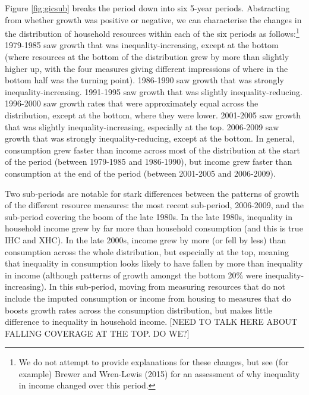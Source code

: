 Figure \ref{fig:gicsub} breaks the period down into six 5-year periods. Abstracting from whether growth was positive or negative, we can characterise the changes in the distribution of household resources within each of the six periods as follows:\footnote{We do not attempt to provide explanations for these changes, but see (for example) Brewer and Wren-Lewis (2015) for an assessment of why inequality in income changed over this period.} 1979-1985 saw growth that was inequality-increasing, except at the bottom (where resources at the bottom of the distribution grew by more than slightly higher up, with the four measures giving different impressions of where in the bottom half was the turning point). 1986-1990 saw growth that was strongly inequality-increasing. 1991-1995 saw growth that was slightly inequality-reducing. 1996-2000 saw growth rates that were approximately equal across the distribution, except at the bottom, where they were lower. 2001-2005 saw growth that was slightly inequality-increasing, especially at the top. 2006-2009 saw growth that was strongly inequality-reducing, except at the bottom. In general, consumption grew faster than income across most of the distribution at the start of the period (between 1979-1985 and 1986-1990), but income grew faster than consumption at the end of the period (between 2001-2005 and 2006-2009).

Two sub-periods are notable for stark differences between the patterns of growth of the different resource measures: the most recent sub-period, 2006-2009, and the sub-period covering the boom of the late 1980s.  In the late 1980s, inequality in household income grew by far more than household consumption (and this is true IHC and XHC). In the late 2000s, income grew by more (or fell by less) than consumption across the whole distribution, but especially at the top, meaning that inequality in consumption looks likely to have fallen by more than inequality in income (although patterns of growth amongst the bottom 20\% were inequality-increasing). In this sub-period, moving from measuring resources that do not include the imputed consumption or income from housing to measures that do boosts growth rates across the consumption distribution, but makes little difference to inequality in household income. [NEED TO TALK HERE ABOUT FALLING COVERAGE AT THE TOP. DO WE?]

